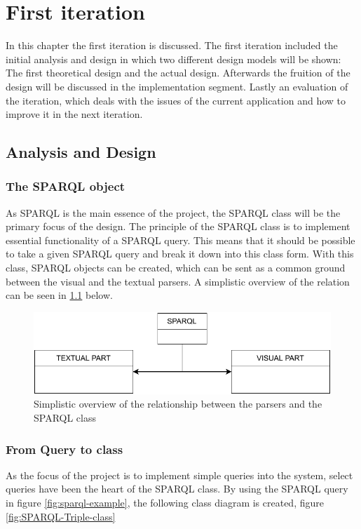 \chapter{First iteration}
\label{chap:first-iteration}
In this chapter the first iteration is discussed. The first iteration included the initial analysis and design in which two different design models will be shown: The first theoretical design and the actual design. Afterwards the fruition of the design will be discussed in the implementation segment. Lastly an evaluation of the iteration, which deals with the issues of the current application and how to improve it in the next iteration.

\section{Analysis and Design}
\subsection{The SPARQL object}
As SPARQL is the main essence of the project, the SPARQL class will be the primary focus of the design. The principle of the SPARQL class is to implement essential functionality of a SPARQL query. This means that it should be possible to take a given SPARQL query and break it down into this class form. With this class, SPARQL objects can be created, which can be sent as a common ground between the visual and the textual parsers. A simplistic overview of the relation can be seen in \ref{fig:sparql-interaction} below.
\begin{figure}[h]
    \centering
    \includegraphics[width=1\textwidth]{figures/sparql-interaction.pdf}
    \caption{Simplistic overview of the relationship between the parsers and the SPARQL class}
    \label{fig:sparql-interaction}
\end{figure}

\subsection{From Query to class}
As the focus of the project is to implement simple queries into the system, select queries have been the heart of the SPARQL class.  By using the SPARQL query in figure \ref{fig:sparql-example}, the following class diagram is created, figure \ref{fig:SPARQL-Triple-class}

